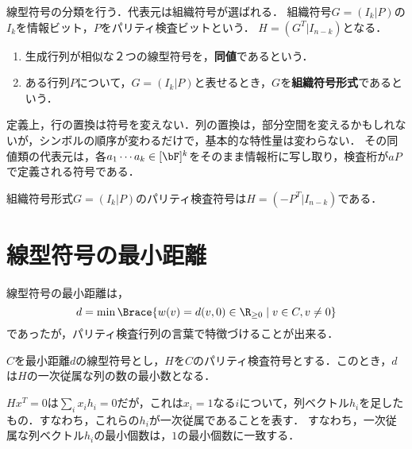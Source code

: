 \documentclass[uplatex,dvipdfmx]{jsreport}
\begin{document}
\begin{tcolorbox}[colframe=ForestGreen, colback=ForestGreen!10!white,breakable,colbacktitle=ForestGreen!40!white,coltitle=black,fonttitle=\bfseries\sffamily,
title=線型符号の統一論]
    線型符号の分類を行う．代表元は組織符号が選ばれる．
    組織符号$G=(I_k|P)$の$I_k$を情報ビット，$P$をパリティ検査ビットという．
    $H=(G^T|I_{n-k})$となる．
\end{tcolorbox}

\begin{definition}\mbox{}
    \begin{enumerate}
        \item 生成行列が相似な２つの線型符号を，\textbf{同値}であるという．
        \item ある行列$P$について，$G=(I_k|P)$と表せるとき，$G$を\textbf{組織符号形式}であるという．
    \end{enumerate}
\end{definition}
\begin{remarks}
    定義上，行の置換は符号を変えない．列の置換は，部分空間を変えるかもしれないが，シンボルの順序が変わるだけで，基本的な特性量は変わらない．
    その同値類の代表元は，各$a_1\cdots a_k\in[\bF]^k$をそのまま情報桁に写し取り，検査桁が$aP$で定義される符号である．
\end{remarks}

\begin{lemma}
    組織符号形式$G=(I_k|P)$のパリティ検査符号は$H=(-P^T|I_{n-k})$である．
\end{lemma}

\section{線型符号の最小距離}

\begin{tcolorbox}[colframe=ForestGreen, colback=ForestGreen!10!white,breakable,colbacktitle=ForestGreen!40!white,coltitle=black,fonttitle=\bfseries\sffamily,
title=]
    線型符号の最小距離は，
    \[d=\min\Brace{w(v)=d(v,0)\in\R_{\ge0}\mid v\in C,v\ne 0}\]
    であったが，パリティ検査行列の言葉で特徴づけることが出来る．
\end{tcolorbox}

\begin{theorem}
    $C$を最小距離$d$の線型符号とし，$H$を$C$のパリティ検査符号とする．このとき，$d$は$H$の一次従属な列の数の最小数となる．
\end{theorem}
\begin{remarks}
    $Hx^T=0$は$\sum_ix_ih_i=0$だが，これは$x_i=1$なる$i$について，列ベクトル$h_i$を足したもの．すなわち，これらの$h_i$が一次従属であることを表す．
    すなわち，一次従属な列ベクトル$h_i$の最小個数は，$1$の最小個数に一致する．
\end{remarks}
\end{document}
